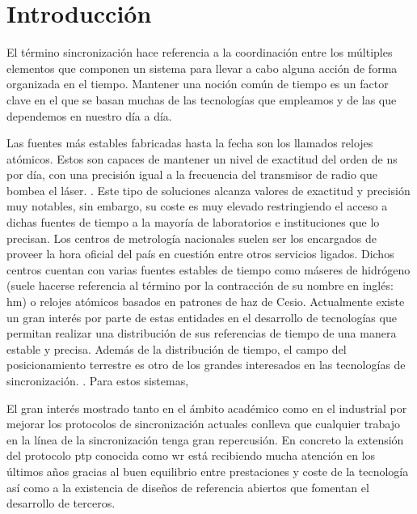 \chapter{Introducción}

El término sincronización hace referencia a la coordinación entre los múltiples 
elementos que componen un sistema para llevar a cabo alguna acción de forma 
organizada en el tiempo. Mantener una noción común de tiempo es un factor clave 
en el que se basan muchas de las tecnologías que empleamos y de las que 
dependemos en nuestro día a día.

 Las 
fuentes más estables fabricadas hasta la fecha son los llamados relojes
atómicos. 
 Estos son capaces de mantener un nivel de exactitud del 
orden de \gls{ns} por día, con una precisión igual a la frecuencia del
transmisor de radio que bombea el láser.  . Este tipo de 
soluciones alcanza valores de exactitud y precisión muy notables, sin embargo, 
su coste es muy elevado restringiendo el acceso a dichas fuentes de tiempo a la 
mayoría de laboratorios e instituciones que lo precisan. Los centros de 
metrología nacionales suelen ser los encargados de proveer la hora oficial del 
país en cuestión entre otros servicios ligados. Dichos centros cuentan con 
varias fuentes estables de tiempo como máseres de hidrógeno (suele
hacerse referencia al término por la contracción de su nombre en inglés: 
\acrshort{hm}) o relojes atómicos basados en patrones de haz de Cesio. 
Actualmente existe un gran interés por parte de estas entidades en el 
desarrollo de tecnologías que permitan realizar una distribución de sus 
referencias de tiempo de una manera estable y precisa.
Además de la distribución de tiempo, el campo del posicionamiento terrestre es 
otro de los grandes interesados en las tecnologías de sincronización. 
. Para estos sistemas, 

El gran interés mostrado tanto en el ámbito académico como en el industrial por 
mejorar los protocolos de sincronización actuales conlleva que cualquier 
trabajo en la línea de la sincronización tenga gran repercusión. En concreto la 
extensión del protocolo \gls{ptp} conocida como \gls{wr} está recibiendo mucha 
atención en los últimos años gracias al buen equilibrio entre prestaciones y 
coste de la tecnología así como a la existencia de diseños de referencia 
abiertos que fomentan el desarrollo de terceros.


